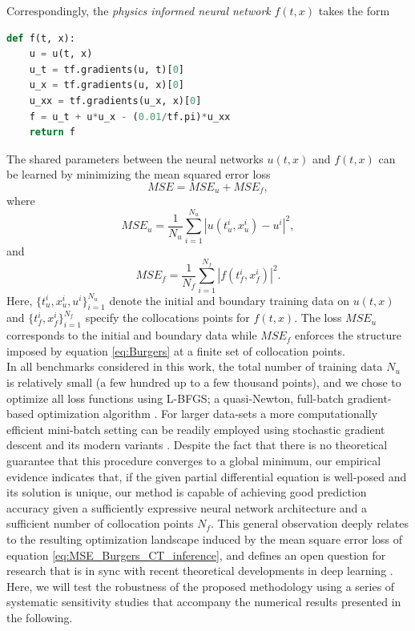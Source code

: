 \documentclass[preprint,12pt]{elsarticle}
\begin{document}
Correspondingly, the \emph{physics informed neural network} $f(t,x)$ takes the form
\begin{lstlisting}[language=Python]
def f(t, x):
    u = u(t, x)
    u_t = tf.gradients(u, t)[0]
    u_x = tf.gradients(u, x)[0]
    u_xx = tf.gradients(u_x, x)[0]
    f = u_t + u*u_x - (0.01/tf.pi)*u_xx
    return f
\end{lstlisting}
The shared parameters between the neural networks $u(t,x)$ and $f(t,x)$ can be learned by minimizing the mean squared error loss
\begin{equation}\label{eq:MSE_Burgers_CT_inference}
MSE = MSE_u + MSE_f,
\end{equation}
where
\[
MSE_u = \frac{1}{N_u}\sum_{i=1}^{N_u} |u(t^i_u,x_u^i) - u^i|^2,
\]
and
\[
MSE_f = \frac{1}{N_f}\sum_{i=1}^{N_f}|f(t_f^i,x_f^i)|^2.
\]
Here, $\{t_u^i, x_u^i, u^i\}_{i=1}^{N_u}$ denote the initial and boundary training data on $u(t,x)$ and $\{t_f^i, x_f^i\}_{i=1}^{N_f}$ specify the collocations points for $f(t,x)$. The loss $MSE_u$ corresponds to the initial and boundary data while $MSE_f$ enforces the structure imposed by equation \eqref{eq:Burgers} at a finite set of collocation points.\\

In all benchmarks considered in this work, the total number of training data $N_u$ is relatively small (a few hundred up to a few thousand points), and we chose to optimize all loss functions using L-BFGS; a quasi-Newton, full-batch gradient-based optimization algorithm \cite{liu1989limited}. For larger data-sets a more computationally efficient mini-batch setting can be readily employed using stochastic gradient descent and its modern variants \cite{goodfellow2016deep,kingma2014adam}. Despite the fact that there is no theoretical guarantee that this procedure converges to a global minimum, our empirical evidence indicates that, if the given partial differential equation is well-posed and its solution is unique, our method is capable of achieving good prediction accuracy given a sufficiently expressive neural network architecture and a sufficient number of collocation points $N_f$. This general observation deeply relates to the resulting optimization landscape induced by the mean square error loss of equation \ref{eq:MSE_Burgers_CT_inference}, and defines an open question for research that is in sync with recent theoretical developments in deep learning \cite{choromanska2015loss,shwartz2017opening}.
Here, we will test the robustness of the proposed methodology using a series of systematic sensitivity studies that accompany the numerical results presented in the following.\\
\end{document}
